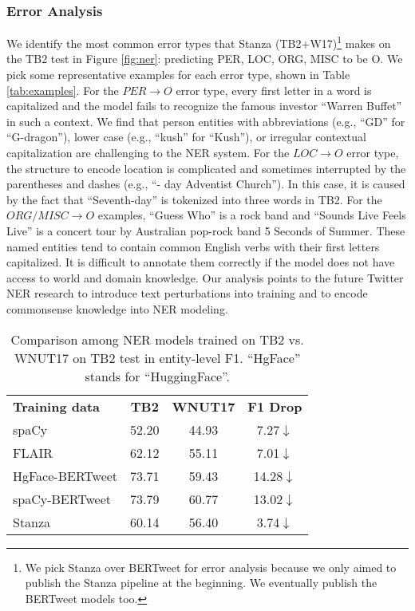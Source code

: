 \documentclass[10pt, a4paper]{article}
\begin{document}
\subsubsection{Error Analysis}
We identify the most common error types that Stanza (TB2+W17)\footnote{We pick Stanza over BERTweet for error analysis because we only aimed to publish the Stanza pipeline at the beginning. We eventually publish the BERTweet models too.} makes on the TB2 test in Figure \ref{fig:ner}: predicting PER, LOC, ORG, MISC to be O.  We pick some representative examples for each error type, shown in Table \ref{tab:examples}.  For the  $PER\rightarrow O$ error type, every first letter in a word is capitalized and the model fails to recognize the famous investor ``Warren Buffet'' in such a context. We find that person entities with abbreviations (e.g., ``GD'' for ``G-dragon''), lower case (e.g., ``kush'' for ``Kush''), or irregular contextual capitalization are challenging to the NER system. For the  $LOC\rightarrow O$ error type, the  structure to encode location is complicated and sometimes interrupted by the parentheses and dashes (e.g., ``- day Adventist Church''). In this case, it is caused by the fact that ``Seventh-day'' is tokenized into three words in TB2.  For the $ORG/MISC \rightarrow O$ examples, ``Guess Who'' is a rock band and ``Sounds Live Feels Live'' is a concert tour by Australian pop-rock band 5 Seconds of Summer. These named entities tend to contain common English verbs with their first letters capitalized. It is difficult to annotate them correctly if the model does not have access to world and domain knowledge. Our analysis points to the future Twitter NER research to introduce text perturbations into training and to encode commonsense knowledge into NER modeling.





\begin{table}[h]
\centering
\begin{tabular}{l|cc|c}
\textbf{Training data} & \textbf{TB2} & \textbf{WNUT17} & \textbf{F1 Drop}\\ \Xhline{2\arrayrulewidth}
spaCy & 52.20 & 44.93 & 7.27$\downarrow$\\
FLAIR &  62.12 & 55.11 &  7.01$\downarrow$\\
\hdashline
HgFace-BERTweet & 73.71 & 59.43 & 14.28$\downarrow$\\
spaCy-BERTweet &  73.79 & 60.77 & 13.02$\downarrow$ \\
\hline
Stanza &  60.14 & 56.40  &  3.74$\downarrow$\\
\end{tabular}
\caption{Comparison among NER models trained on TB2 vs. WNUT17 on TB2 test in entity-level F1. ``HgFace'' stands for ``HuggingFace''.}
\label{tab:NER_WNUT17}
\end{table}
\end{document}
